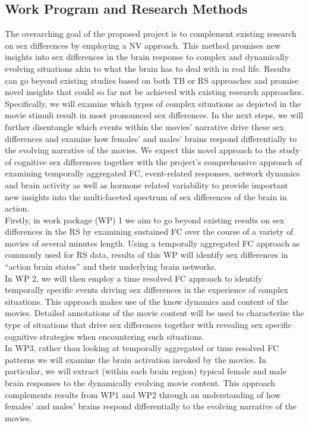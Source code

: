 \documentclass[11pt,a4paper]{article}
\begin{document}
\subsection*{Work Program and Research Methods}
The overarching goal of the proposed project is to complement existing research on sex differences by employing a 
NV approach. This method promises new insights into sex differences in the brain response to complex and 
dynamically evolving situations akin to what the brain has to deal with in real life. 
Results can go beyond existing studies based on both TB or RS approaches and promise novel insights that 
could so far not be achieved with existing research approaches. Specifically, we will examine which types 
of complex situations as depicted in the movie stimuli result in most pronounced sex differences. 
In the next steps, we will further disentangle which events within the movies' narrative drive these sex 
differences and examine how females’ and males’ brains respond differentially to the evolving narrative of the movies. 
We expect this novel approach to the study of cognitive sex differences together with the project's comprehensive 
approach of examining temporally aggregated FC, event-related responses, network dynamics and brain 
activity as well as hormone related variability to provide important new insights into the 
multi-faceted spectrum of sex differences of the brain in action.\\ 
Firstly, in work package (WP) 1 we aim to go beyond existing results on sex differences in the RS 
by examining sustained FC over the course of a variety of movies of several minutes length. Using a temporally 
aggregated FC approach as commonly used for RS data, results of this WP will identify sex differences in 
“action brain states” and their underlying brain networks.\\ 
In WP 2, we will then employ a time resolved FC approach to identify temporally specific events driving sex 
differences in the experience of complex situations. This approach makes use of the know dynamics and content 
of the movies. Detailed annotations of the movie content will be used to characterize the type of situations 
that drive sex differences together with revealing sex specific cognitive strategies when encountering such situations.\\ 
In WP3, rather than looking at temporally aggregated or time resolved FC patterns we will examine the brain 
activation invoked by the movies. In particular, we will extract (within each brain region) typical 
female and male brain responses to the dynamically evolving movie content. This approach complements 
results from WP1 and WP2 through an understanding of how females' and males' brains respond differentially 
to the evolving narrative of the movies. 
\end{document}
